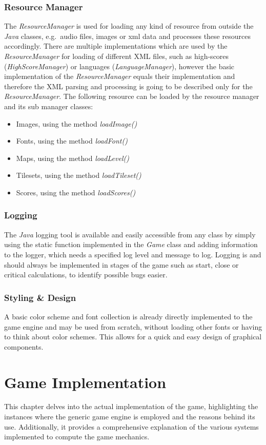 \subsubsection{Resource Manager}\label{subsubsec:resource-manager}
The \textit{ResourceManager} is used for loading any kind of resource from outside the \textit{Java} classes, e.g.\ audio files, images or xml data and processes
these resources accordingly.
There are multiple implementations which are used by the \textit{ResourceManager} for loading of different XML files,
such as high-scores (\textit{HighScoreManager}) or languages (\textit{LanguageManager}),
however the basic implementation of the \textit{ResourceManager} equals their implementation and therefore the XML
parsing and processing is going to be described only for the \textit{ResourceManager}.
The following resource can be loaded by the resource manager and its sub manager classes:
\begin{itemize}
    \item Images, using the method \textit{loadImage()}
    \item Fonts, using the method \textit{loadFont()}
    \item Maps, using the method \textit{loadLevel()}
    \item Tilesets, using the method \textit{loadTileset()}
    \item Scores, using the method \textit{loadScores()}
\end{itemize}
\subsubsection{Logging}\label{subsubsec:logging}
The \textit{Java} logging tool is available and easily accessible from any class by simply using the static function
implemented in the \textit{Game} class and adding information to
the logger, which needs a specified log level and message to log.
Logging is and should always be implemented in stages of the game such as start, close or critical calculations, to identify possible bugs
easier.
\subsubsection{Styling \& Design}\label{subsubsec:styling-&-design}
A basic color scheme and font collection is already directly implemented to the game engine and may be used from scratch,
without loading other fonts or having to think about
color schemes.
This allows for a quick and easy design of graphical components.
\section{Game Implementation}\label{sec:game-implementation}
This chapter delves into the actual implementation of the game, highlighting the instances where the generic game engine is
employed and the reasons behind its use.
Additionally, it provides a comprehensive explanation of the various systems implemented to compute the game mechanics.
